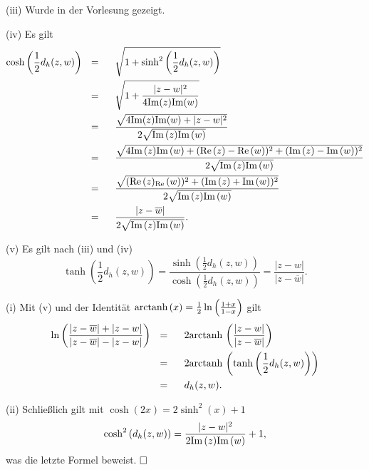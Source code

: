 \documentclass[11pt]{book}
\numberwithin{dummy}{section}
\theoremstyle{nonumberbreak}
\newenvironment{prob}[1][]{\ifthenelse{\equal{#1}{}}{\problem}{\problem[#1]}\rm}{\endproblem}
\newenvironment{sol}[1][]{\ifthenelse{\equal{#1}{}}{\solution}{\solution[#1]}\rm}{\endsolution}
\newcommand{\Imm}{\mathrm{Im}\hspace{1.5pt}}
\newcommand{\arctanh}{\mathrm{arctanh} \hspace{1.5pt}}
\newcommand{\Ree}{\mathrm{Re}\hspace{1.5pt}}
\begin{document}
\begin{spacing}{1.4}
\begin{prob}
\begin{sol}
\begin{compactenum}
\item[(iii)] Wurde in der Vorlesung gezeigt.
\item[(iv)] Es gilt 
\begin{alignat*}{5}
\cosh \left( \frac{1}{2} d_h(z,w)\right) \ \ &=&& \ \  \sqrt{ 1 + \sinh^2 \left( \frac{1}{2} d_h(z,w)\right)} \\
&=&& \ \ \sqrt{ 1 + \frac{\vert z-w \vert^2}{ 4 \mathrm{Im}(z) \mathrm{Im}(w)} } \\
&=&& \ \ \frac{\sqrt{4 \mathrm{Im}(z) \mathrm{Im}(w) + \vert z-w \vert^2}}{2\sqrt{\Imm(z) \Imm(w)}} \\
&=&& \ \ \frac{\sqrt{4 \Imm(z) \Imm(w) + ( \Ree(z) - \Ree(w))^2 + (\Imm(z)-\Imm(w))^2}}{2\sqrt{\Imm(z) \Imm(w)}} \\
&=&& \ \ \frac{\sqrt{(\Ree(z)_\Ree(w))^2 + (\Imm(z) + \Imm(w))^2}}{2 \sqrt{\Imm(z) \Imm(w)}} \\
&=&& \ \ \frac{\vert z- \overline{w}\vert}{2 \sqrt{\Imm(z)\Imm(w)}}.
\end{alignat*}
\item[(v)] Es gilt nach (iii) und (iv)
$$\tanh \left( \frac{1}{2} d_h(z,w)\right) = \frac{\sinh \left( \frac{1}{2} d_h(z,w)\right)}{\cosh \left( \frac{1}{2} d_h(z,w)\right)} = \frac{\vert z-w\vert}{\vert z - \overline{w}\vert}.$$
\item[(i)] Mit (v) und der Identität $\arctanh(x) = \frac{1}{2} \ln \left(\frac{1+x}{1-x}\right)$ gilt
\begin{alignat*}{5} 
\ln \left( \frac{\vert z - \overline{w}\vert + \vert z-w\vert}{\vert z -\overline{w}\vert - \vert z- w\vert}\right) \ \ &=&& \ \ 2 \arctanh \left( \frac{\vert z-w\vert}{\vert z - \overline{w}\vert}\right) \\
&=&& \ \ 2 \arctanh \left( \tanh\left( \frac{1}{2} d_h(z,w)\right) \right) \\
&=&& \ \ d_h(z,w).
\end{alignat*}
\item[(ii)] Schließlich gilt mit $\cosh(2x) = 2 \sinh^2(x) + 1$ 
$$\cosh^2\left( d_h(z,w)\right) = \frac{\vert z-w\vert^2}{2 \Imm(z) \Imm(w)} + 1,$$
was die letzte Formel beweist. $\hfill \Box$


\end{compactenum}
\end{sol}

\end{prob}





\end{spacing}
\end{document}
